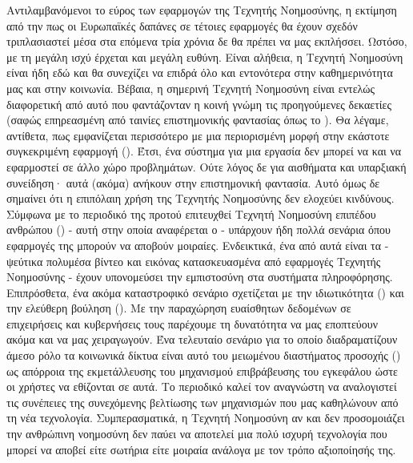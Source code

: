 Αντιλαμβανόμενοι το εύρος των εφαρμογών της Τεχνητής Νοημοσύνης, 
η εκτίμηση από την  πως οι Ευρωπαϊκές δαπάνες σε τέτοιες εφαρμογές θα έχουν σχεδόν τριπλασιαστεί μέσα στα επόμενα τρία χρόνια δε θα πρέπει να μας εκπλήσσει. Ωστόσο, με τη μεγάλη ισχύ έρχεται και μεγάλη ευθύνη. Είναι αλήθεια, η Τεχνητή Νοημοσύνη είναι ήδη εδώ και θα συνεχίζει να επιδρά όλο και εντονότερα στην καθημερινότητα μας και στην κοινωνία. Βέβαια, η σημερινή Τεχνητή Νοημοσύνη είναι εντελώς διαφορετική από αυτό που φαντάζονταν η κοινή γνώμη τις προηγούμενες δεκαετίες (σαφώς επηρεασμένη από ταινίες επιστημονικής φαντασίας όπως το ). Θα λέγαμε, αντίθετα, πως εμφανίζεται περισσότερο με μια περιορισμένη μορφή στην εκάστοτε συγκεκριμένη εφαρμογή (). Έτσι, ένα  σύστημα για μια εργασία δεν μπορεί να  και να εφαρμοστεί σε άλλο χώρο προβλημάτων. Ούτε λόγος δε για αισθήματα και υπαρξιακή συνείδηση· αυτά (ακόμα) ανήκουν στην επιστημονική φαντασία. 
Αυτό όμως δε σημαίνει ότι η επιπόλαιη χρήση της Τεχνητής Νοημοσύνης δεν ελοχεύει κινδύνους. Σύμφωνα με το περιοδικό  της  \cite{bajema_ais_2022} προτού επιτευχθεί Τεχνητή Νοημοσύνη επιπέδου ανθρώπου () - αυτή στην οποία αναφέρεται ο  - υπάρχουν ήδη πολλά σενάρια όπου εφαρμογές της μπορούν να αποβούν μοιραίες. Ενδεικτικά, ένα από αυτά είναι τα  - ψεύτικα πολυμέσα βίντεο και εικόνας κατασκευασμένα από εφαρμογές Τεχνητής Νοημοσύνης - έχουν υπονομεύσει την εμπιστοσύνη στα συστήματα πληροφόρησης. Επιπρόσθετα, ένα ακόμα καταστροφικό σενάριο σχετίζεται με την ιδιωτικότητα () και την ελεύθερη βούληση (). Με την παραχώρηση ευαίσθητων δεδομένων σε επιχειρήσεις και κυβερνήσεις τους παρέχουμε τη δυνατότητα να μας εποπτεύουν ακόμα και να μας χειραγωγούν. Ένα τελευταίο σενάριο για το οποίο διαδραματίζουν άμεσο ρόλο τα κοινωνικά δίκτυα είναι αυτό του μειωμένου διαστήματος προσοχής () ως απόρροια της εκμετάλλευσης του μηχανισμού επιβράβευσης του εγκεφάλου ώστε οι χρήστες να εθίζονται σε αυτά. Το περιοδικό καλεί τον αναγνώστη να αναλογιστεί τις συνέπειες της συνεχόμενης βελτίωσης των μηχανισμών που μας καθηλώνουν από τη νέα τεχνολογία. Συμπερασματικά, η Τεχνητή Νοημοσύνη αν και δεν προσομοιάζει την ανθρώπινη νοημοσύνη δεν παύει να αποτελεί μια πολύ ισχυρή τεχνολογία που μπορεί να αποβεί είτε σωτήρια είτε μοιραία ανάλογα με τον τρόπο αξιοποίησής της.
\par

